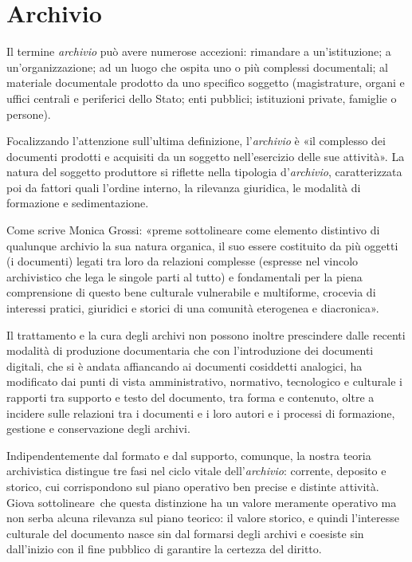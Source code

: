

\chapter{Archivio}

Il termine \emph{archivio} può avere numerose accezioni: rimandare a
un'istituzione; a un'organizzazione; ad un luogo che ospita uno o più
complessi documentali; al materiale documentale prodotto da uno
specifico soggetto (magistrature, organi e uffici centrali e periferici
dello Stato; enti pubblici; istituzioni private, famiglie o persone).

Focalizzando l'attenzione sull'ultima definizione, l'\emph{archivio} è
«il complesso dei documenti prodotti e acquisiti da un soggetto
nell'esercizio delle sue attività». La natura del soggetto produttore si
riflette nella tipologia d'\emph{archivio}, caratterizzata poi da
fattori quali l'ordine interno, la rilevanza giuridica, le modalità di
formazione e sedimentazione.

Come scrive Monica Grossi: «preme sottolineare come elemento distintivo
di qualunque archivio la sua natura organica, il suo essere costituito
da più oggetti (i documenti) legati tra loro da relazioni complesse
(espresse nel vincolo archivistico che lega le singole parti al tutto) e
fondamentali per la piena comprensione di questo bene culturale
vulnerabile e multiforme, crocevia di interessi pratici, giuridici e
storici di una comunità eterogenea e diacronica».

Il trattamento e la cura degli archivi non possono inoltre prescindere
dalle recenti modalità di produzione documentaria che con l'introduzione
dei documenti digitali, che si è andata affiancando ai documenti
cosiddetti analogici, ha modificato dai punti di vista amministrativo,
normativo, tecnologico e culturale i rapporti tra supporto e testo del
documento, tra forma e contenuto, oltre a incidere sulle relazioni tra i
documenti e i loro autori e i processi di formazione, gestione e
conservazione degli archivi.

Indipendentemente dal formato e dal supporto, comunque, la nostra teoria
archivistica distingue tre fasi nel ciclo vitale dell'\emph{archivio}:
corrente, deposito e storico, cui corrispondono sul piano operativo ben
precise e distinte attività. Giova sottolineare~che questa distinzione
ha un valore meramente operativo ma non serba alcuna rilevanza sul piano
teorico: il valore storico, e quindi l'interesse culturale del documento
nasce sin dal formarsi degli archivi e coesiste sin dall'inizio con il
fine pubblico di garantire la certezza del diritto.

